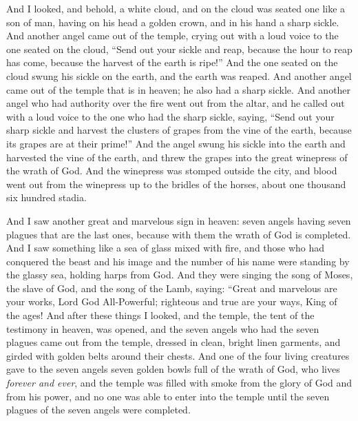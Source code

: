 \begin{biblechapter}
 And I looked, and behold, a white cloud, and on the cloud was seated one like a son of man, having on his head a golden crown, and in his hand a sharp sickle.
\verse And another angel came out of the temple, crying out with a loud voice to the one seated on the cloud, “Send out your sickle and reap, because the hour to reap has come, because the harvest of the earth is ripe!”
\verse And the one seated on the cloud swung his sickle on the earth, and the earth was reaped.
\verse And another angel came out of the temple that is in heaven; he also had a sharp sickle.
\verse And another angel who had authority over the fire went out from the altar, and he called out with a loud voice to the one who had the sharp sickle, saying, “Send out your sharp sickle and harvest the clusters of grapes from the vine of the earth, because its grapes are at their prime!”
\verse And the angel swung his sickle into the earth and harvested the vine of the earth, and threw the grapes into the great winepress of the wrath of God.
\verse And the winepress was stomped outside the city, and blood went out from the winepress up to the bridles of the horses, about one thousand six hundred stadia.
\end{biblechapter}

\begin{biblechapter} %
 And I saw another great and marvelous sign in heaven: seven angels having seven plagues that are the last ones, because with them the wrath of God is completed.
\verse And I saw something like a sea of glass mixed with fire, and those who had conquered the beast and his image and the number of his name were standing by the glassy sea, holding harps from God.
\verse And they were singing the song of Moses, the slave of God, and the song of the Lamb, saying:
\verse “Great and marvelous are your works, 
Lord God All-Powerful; 
righteous and true are your ways, 
King of the ages!
\verse And after these things I looked, and the temple, the tent of the testimony in heaven, was opened,
\verse and the seven angels who had the seven plagues came out from the temple, dressed in clean, bright linen garments, and girded with golden belts around their chests.
\verse And one of the four living creatures gave to the seven angels seven golden bowls full of the wrath of God, who lives \textit{forever and ever},
\verse and the temple was filled with smoke from the glory of God and from his power, and no one was able to enter into the temple until the seven plagues of the seven angels were completed.
\end{biblechapter}

